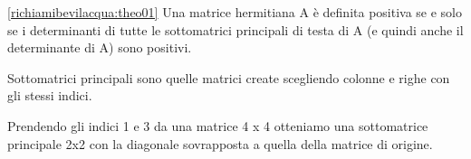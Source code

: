 \begin{theo}
 \ref{richiamibevilacqua:theo01}
 Una matrice hermitiana A \`e definita positiva se e solo se i
determinanti di tutte le sottomatrici principali di testa di A (e quindi anche
il determinante di A) sono positivi.
\end{theo}

\begin{defn}
  Sottomatrici principali sono quelle matrici create scegliendo
  colonne e righe con gli stessi indici.
\end{defn}

\begin{example}
  Prendendo gli indici 1 e 3 da una matrice 4 x 4 otteniamo una
  sottomatrice principale 2x2 con la diagonale sovrapposta a quella
  della matrice di origine.
\end{example}



